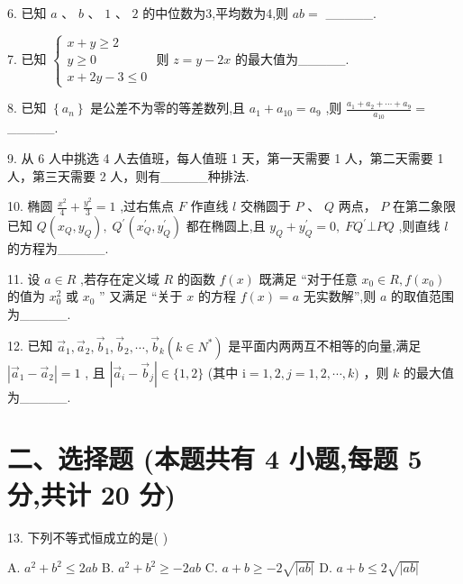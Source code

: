 \documentclass[10pt]{article}
\begin{document}
6. 已知 \(a\text{ 、 }b\text{ 、 }1\text{ 、 }2\) 的中位数为3,平均数为4,则 \({ab} =\) \_\_\_\_\_.

7. 已知 \(\left\{  \begin{array}{l} x + y \geq  2 \\  y \geq  0 \\  x + {2y} - 3 \leq  0 \end{array}\right.\) 则 \(z = y - {2x}\) 的最大值为\_\_\_\_\_.

8. 已知 \(\left\{  {a}_{n}\right\}\) 是公差不为零的等差数列,且 \({a}_{1} + {a}_{10} = {a}_{9}\) ,则 \(\frac{{a}_{1} + {a}_{2} + \cdots  + {a}_{9}}{{a}_{10}} =\) \_\_\_\_\_.

9. 从 6 人中挑选 4 人去值班，每人值班 1 天，第一天需要 1 人，第二天需要 1 人，第三天需要 2 人，则有\_\_\_\_\_种排法.

10. 椭圆 \(\frac{{x}^{2}}{4} + \frac{{y}^{2}}{3} = 1\) ,过右焦点 \(F\) 作直线 \(l\) 交椭圆于 \(P\text{ 、 }Q\) 两点， \(P\) 在第二象限已知 \(Q\left( {{x}_{Q},{y}_{Q}}\right) ,\;{Q}^{\prime }\left( {{x}_{Q}^{\prime },{y}_{Q}^{\prime }}\right)\) 都在椭圆上,且 \({y}_{Q} + {y}_{Q}^{\prime } = 0,\;F{Q}^{\prime } \bot  {PQ}\) ,则直线 \(l\) 的方程为\_\_\_\_\_.

11. 设 \(a \in  R\) ,若存在定义域 \(R\) 的函数 \(f\left( x\right)\) 既满足 “对于任意 \({x}_{0} \in  R,f\left( {x}_{0}\right)\) 的值为 \({x}_{0}^{2}\) 或 \({x}_{0}\) ” 又满足 “关于 \(x\) 的方程 \(f\left( x\right)  = a\) 无实数解”,则 \(a\) 的取值范围为\_\_\_\_\_.

12. 已知 \({\overrightarrow{a}}_{1},{\overrightarrow{a}}_{2},{\overrightarrow{b}}_{1},{\overrightarrow{b}}_{2},\cdots ,{\overrightarrow{b}}_{k}\left( {k \in  {N}^{ * }}\right)\) 是平面内两两互不相等的向量,满足 \(\left| {{\overrightarrow{a}}_{1} - {\overrightarrow{a}}_{2}}\right|  = 1\) , 且 \(\left| {{\overrightarrow{a}}_{i} - {\overrightarrow{b}}_{j}}\right|  \in  \{ 1,2\}\) (其中 \(\mathrm{i} = 1,2,j = 1,2,\cdots ,k)\) ，则 \(k\) 的最大值为\_\_\_\_\_.

\section*{二、选择题 (本题共有 4 小题,每题 5 分,共计 20 分)}

13. 下列不等式恒成立的是( )

A. \({a}^{2} + {b}^{2} \leq  {2ab}\) B. \({a}^{2} + {b}^{2} \geq   - {2ab}\) C. \(a + b \geq   - 2\sqrt{\left| ab\right| }\) D. \(a + b \leq  2\sqrt{\left| ab\right| }\)
\end{document}
